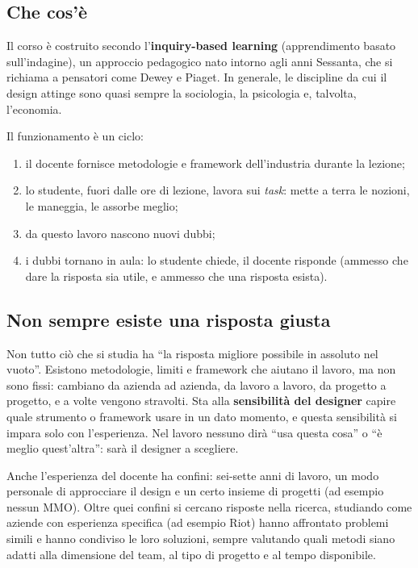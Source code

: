 \subsection{Che cos'è}

Il corso è costruito secondo l'\textbf{inquiry-based learning}
(apprendimento basato sull'indagine), un approccio pedagogico nato intorno
agli anni Sessanta, che si richiama a pensatori come Dewey e Piaget. In
generale, le discipline da cui il design attinge sono quasi sempre la
sociologia, la psicologia e, talvolta, l'economia.

Il funzionamento è un ciclo:
\begin{enumerate}
  \item il docente fornisce metodologie e framework dell'industria durante
        la lezione;
  \item lo studente, fuori dalle ore di lezione, lavora sui \emph{task}:
        mette a terra le nozioni, le maneggia, le assorbe meglio;
  \item da questo lavoro nascono nuovi dubbi;
  \item i dubbi tornano in aula: lo studente chiede, il docente risponde
        (ammesso che dare la risposta sia utile, e ammesso che una risposta
        esista).
\end{enumerate}

\subsection{Non sempre esiste una risposta giusta}

Non tutto ciò che si studia ha ``la risposta migliore possibile in assoluto
nel vuoto''. Esistono metodologie, limiti e framework che aiutano il lavoro,
ma non sono fissi: cambiano da azienda ad azienda, da lavoro a lavoro, da
progetto a progetto, e a volte vengono stravolti. Sta alla
\textbf{sensibilità del designer} capire quale strumento o framework usare in
un dato momento, e questa sensibilità si impara solo con l'esperienza. Nel
lavoro nessuno dirà ``usa questa cosa'' o ``è meglio quest'altra'': sarà il
designer a scegliere.

Anche l'esperienza del docente ha confini: sei-sette anni di lavoro, un modo
personale di approcciare il design e un certo insieme di progetti (ad esempio
nessun MMO). Oltre quei confini si cercano risposte nella ricerca, studiando
come aziende con esperienza specifica (ad esempio Riot) hanno affrontato
problemi simili e hanno condiviso le loro soluzioni, sempre valutando quali
metodi siano adatti alla dimensione del team, al tipo di progetto e al tempo
disponibile.

